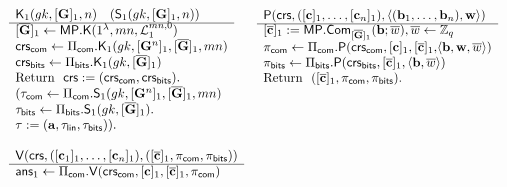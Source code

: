 \begin{figure}[H]
\begin{\algSize}
$$
\begin{array}{ll}
\begin{array}{l}
\algK_1(\gk,[\matr{G}]_1,n)\quad (\mathsf{S}_1(\gk,[\matr{G}]_1,n))\\
\hline\\[-.45cm]
[\overline{\matr{G}}]_1 \gets \MP.\algK(1^\lambda,mn,\distlin_1^{mn,0})\\
\crs_\sfcom\gets\Pi_\sfcom.\algK_1(\gk,[\vecb{G}^n]_1,[\ovG]_1, mn)\\
\crs_\sfbits\gets\Pi_\sfbits.\algK_1(\gk,[\overline{\matr{G}}]_1)\\
\text{Return } \ \mathsf{crs}:=(\crs_\sfcom,\crs_\sfbits).\\
(\tau_\sfcom\gets\Pi_\sfcom.\mathsf{S}_1(\gk,[\matr{G}^n]_1,[\ovG]_1,mn)\\
\tau_\sfbits\gets\Pi_\sfbits.\mathsf{S}_1(\gk,[\overline{\matr{G}}]_1).\\
\tau := (\vecb{a},\tau_\sflin,\tau_\sfbits)).\\
\\
\end{array}
&
\begin{array}{l}
{\algP(\mathsf{crs}, ([\vecb{c}]_1,\ldots,[\vecb{c}_n]_1), \langle (\vecb{b}_1,\ldots,\vecb{b}_n), \vecb{w}\rangle)}\\
\hline\\[-.45cm]
{[\ovecb{c}]_1 :=\MP.\Com_{[\ovG]_1}(\vecb{b};\overline{w})},\overline{w}\gets\Z_q\\
{\pi_\sfcom \gets \Pi_{\sfcom}.\algP(\crs_\sfcom,[\vecb{c}]_1,[\ovecb{c}]_1,}{\langle\vecb{b},\vecb{w},\overline{w}\rangle)}\\
\pi_\sfbits \gets \Pi_\sfbits.\algP(\crs_\sfbits,[\ovc]_1,\langle \vecb{b},\overline{w}\rangle)\\
\text{Return } \  ([\ovc]_1,\pi_\sfcom,\pi_\sfbits). \\
\\
\\
\\
\\
\end{array}\\
\begin{array}{l}
{\algV(\mathsf{crs},([\vecb{c}_1]_1,\ldots,[\vecb{c}_n]_1),([\ovc]_1,\pi_\sfcom,\pi_\sfbits))}\\
\hline
\mathsf{ans}_1 \gets \Pi_\sfcom.\algV(\crs_\sfcom,[\vecb{c}]_1,[\ovc]_1,\pi_\sfcom)\\

\end{array}
\end{array}$$
\end{\algSize}
\end{figure}
